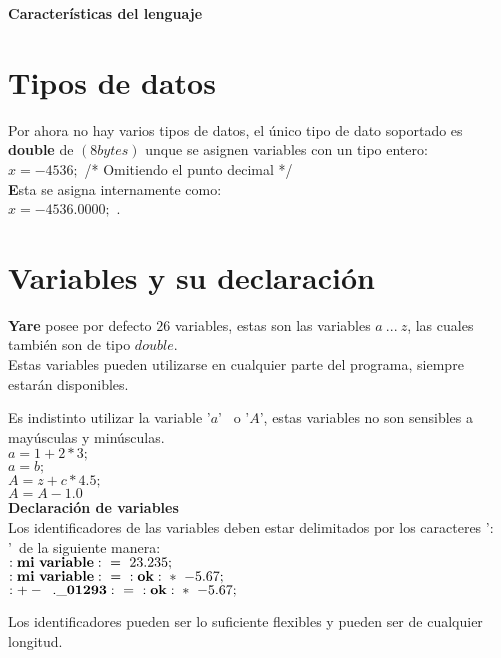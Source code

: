 \documentclass[11pt]{article}
\begin{document}
\newpage
\begin{center}{\bf \LARGE Caracter\'isticas del lenguaje}\end{center}
\section{Tipos de datos}

Por ahora no hay varios tipos de datos, el \'unico tipo de dato soportado es {\bf double} de $(8 bytes )$
unque se asignen variables con un tipo entero:\\
$x = -4536;$ /* Omitiendo el punto decimal */ \\
{\bf E}sta se asigna internamente como:\\
$x = -4536{.}0000;$ .\\

\section{Variables y su declaraci\'on}

{\bf Yare} posee por defecto $26$ variables, estas son las variables $a\ ...\ z$, las cuales tambi\'en son de tipo $double$.\\
Estas variables pueden utilizarse en cualquier parte del programa, siempre estar\'an disponibles.

Es indistinto utilizar la variable '$a$' \ o '$A$', estas variables no son sensibles a may\'usculas y min\'usculas.\\

$a = 1 + 2 * 3;$\\
$a = b;$\\
$A = z + c * 4.5;$\\
$A = A - 1.0$\\

{\bf Declaraci\'on de variables}\\

Los identificadores de las variables deben estar delimitados por los caracteres '$:$'\ de la siguiente manera:\\

${\bf :mi\ variable:\ } =\ 23.235;$\\
${\bf :mi\ variable:\ } =\ {\bf:ok:}\ *\ -5.67;$\\
${\bf : +-\:\ .\_01293 :}\ =\ {\bf:ok:}\ *\ -5.67;$

Los identificadores pueden ser lo suficiente flexibles y pueden ser de cualquier longitud.\\
\end{document}
